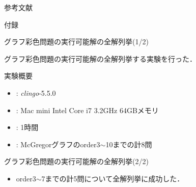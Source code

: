 \documentclass[dvipdfmx,11pt]{beamer}
\begin{document}

\begin{frame}[noframenumbering]{参考文献}
\end{frame}


\begin{frame}[noframenumbering]{}
 \thispagestyle{empty}
 \Huge 付録
\end{frame}


\begin{frame}[noframenumbering]{グラフ彩色問題の実行可能解の全解列挙(1/2)}
 \thispagestyle{empty}

 \begin{block}{}
  グラフ彩色問題の実行可能解の全解列挙する実験を行った．  
 \end{block}

 \begin{block}{実験概要}
  \begin{itemize}
   \item {}: \textit{clingo}-5.5.0
   \item {}: Mac mini Intel Core i7 3.2GHz 64GBメモリ
   \item {}: 1時間
   \item {}: McGregorグラフのorder3$\sim$10までの計8問
  \end{itemize}
 \end{block}
\end{frame}


\begin{frame}[noframenumbering]{グラフ彩色問題の実行可能解の全解列挙(2/2)}
 \thispagestyle{empty}

 \begin{center}
  
 \end{center}

 \begin{itemize}
  \item order3$\sim$7までの計5問について全解列挙に成功した．
 \end{itemize}
\end{frame}

\end{document}
